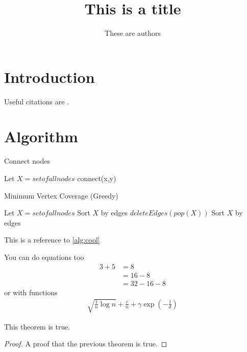 \documentclass{article}
\title{This is a title}
\author{These are authors}
\begin{document}
\maketitle

\section{Introduction}

Useful citations are \cite{KW14,GKK13}.

\section{Algorithm}

\begin{algorithm}[H]
\caption{Connect nodes}\label{alg:cool}
\begin{algorithmic}
\State Let $X = set of all nodes$
\State connect(x,y)
\EndIf
\EndFor
\EndFor
\end{algorithmic}
\end{algorithm}

\begin{algorithm}[H]
\caption{Minimum Vertex Coverage (Greedy)}
\begin{algorithmic}
\State Let $X = set of all nodes$
\State Sort $X$ by edges
\State $deleteEdges(pop(X))$
\State Sort $X$ by edges
\EndWhile
\end{algorithmic}
\end{algorithm}

This is a reference to \cref{alg:cool}

You can do equations too
\begin{align}
3 + 5 
&= 8 \\
&= 16 - 8 \\
&= 32 - 16 - 8
\end{align}
or with functions
\begin{align}
\sqrt{\frac{1}{n} \log n} + \frac{c}{n} + \gamma \exp\left(-\frac{1}{d}\right)
\end{align}

\begin{theorem}
This theorem is true.
\end{theorem}

\begin{proof}
A proof that the previous theorem is true.
\end{proof}
\end{document}
